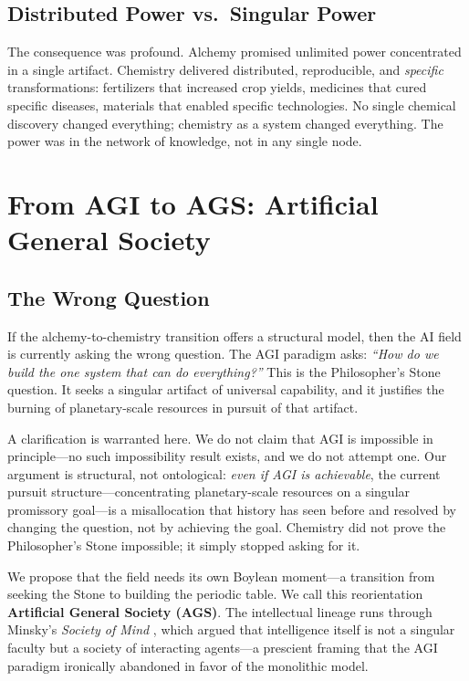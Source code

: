 \documentclass[12pt]{article}
\begin{document}
\subsection{Distributed Power vs.\ Singular Power}
\label{sec:distributed}

The consequence was profound. Alchemy promised unlimited power concentrated in a single artifact. Chemistry delivered distributed, reproducible, and \emph{specific} transformations: fertilizers that increased crop yields, medicines that cured specific diseases, materials that enabled specific technologies. No single chemical discovery changed everything; chemistry as a system changed everything. The power was in the network of knowledge, not in any single node.

\section{From AGI to AGS: Artificial General Society}
\label{sec:ags}

\subsection{The Wrong Question}
\label{sec:wrongquestion}

If the alchemy-to-chemistry transition offers a structural model, then the AI field is currently asking the wrong question. The AGI paradigm asks: \emph{``How do we build the one system that can do everything?''} This is the Philosopher's Stone question. It seeks a singular artifact of universal capability, and it justifies the burning of planetary-scale resources in pursuit of that artifact.

A clarification is warranted here. We do not claim that AGI is impossible in principle---no such impossibility result exists, and we do not attempt one. Our argument is structural, not ontological: \emph{even if AGI is achievable}, the current pursuit structure---concentrating planetary-scale resources on a singular promissory goal---is a misallocation that history has seen before and resolved by changing the question, not by achieving the goal. Chemistry did not prove the Philosopher's Stone impossible; it simply stopped asking for it.

We propose that the field needs its own Boylean moment---a transition from seeking the Stone to building the periodic table. We call this reorientation \textbf{Artificial General Society (AGS)}. The intellectual lineage runs through Minsky's \emph{Society of Mind} \citep{minsky1986}, which argued that intelligence itself is not a singular faculty but a society of interacting agents---a prescient framing that the AGI paradigm ironically abandoned in favor of the monolithic model.
\end{document}
